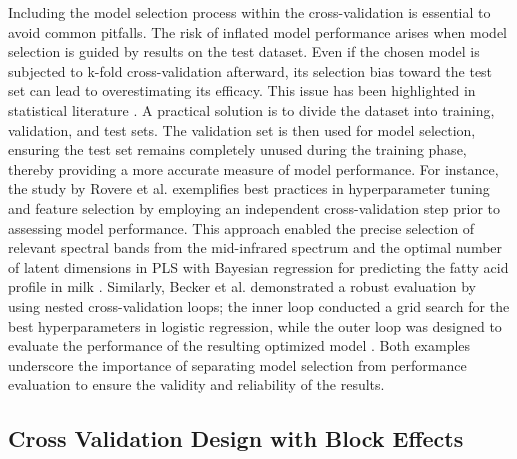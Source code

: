 Including the model selection process within the cross-validation is essential to avoid common pitfalls. The risk of inflated model performance arises when model selection is guided by results on the test dataset. Even if the chosen model is subjected to k-fold cross-validation afterward, its selection bias toward the test set can lead to overestimating its efficacy. This issue has been highlighted in statistical literature \citep{hastie_elements_2009}. A practical solution is to divide the dataset into training, validation, and test sets. The validation set is then used for model selection, ensuring the test set remains completely unused during the training phase, thereby providing a more accurate measure of model performance. For instance, the study by Rovere et al. exemplifies best practices in hyperparameter tuning and feature selection by employing an independent cross-validation step prior to assessing model performance. This approach enabled the precise selection of relevant spectral bands from the mid-infrared spectrum and the optimal number of latent dimensions in PLS with Bayesian regression for predicting the fatty acid profile in milk \citep{rovere_prediction_2021}. Similarly, Becker et al. demonstrated a robust evaluation by using nested cross-validation loops; the inner loop conducted a grid search for the best hyperparameters in logistic regression, while the outer loop was designed to evaluate the performance of the resulting optimized model \citep{becker_predicting_2021}. Both examples underscore the importance of separating model selection from performance evaluation to ensure the validity and reliability of the results.

\subsection{Cross Validation Design with Block Effects}

